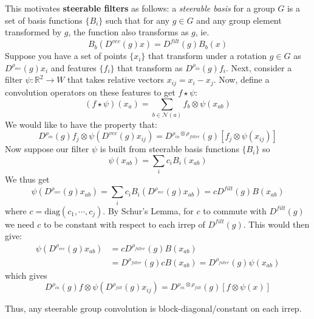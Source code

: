 \documentclass[9pt]{article}
\begin{document}
\begin{multicols}{2}
This motivates \textbf{steerable filters} as follows: 
a \textit{steerable basis} for a group $G$ is a set of 
basis functions $\{B_i\}$ such that for any $g \in G$
and any group element transformed by $g$, the function
also transforms as $g$, ie.
\begin{equation}
    B_b(D^{vec}(g)x) = D^{filt}(g)B_b(x) 
\end{equation}
\newline
Suppose you have a set of points $\{x_i\}$ that transform under a rotation $g \in G$ as $D^{\rho_{vec}}(g)x_i$ and features $\{f_i\}$ that 
transform as $D^{\rho_{in}}(g)f_i$. Next, consider a filter $\psi: \mathbb{R}^2
\to W$ that takes relative vectors $x_{ij} = x_i - x_j$. Now, define a convolution operators on these features to get 
$f \star \psi: $
\begin{equation}
    (f \star \psi)(x_a) = \sum_{ b \in \mathcal{N}(a)} f_b \otimes \psi(x_{ab})
\end{equation}
We would like to have the property that:
\begin{equation}
    D^{\rho_{in}}(g)f_j \otimes \psi(D^{vec}(g)x_{ij}) = 
    D^{\rho_{in} \otimes \rho_{filter}}(g)[f_j \otimes \psi(x_{ij})]
\end{equation}
Now suppose our filter $\psi$ is built from steerable
basis functions $\{B_i\}$ so
\begin{equation}
    \psi(x_{ab}) = \sum\limits_{i}c_iB_i(x_{ab})
\end{equation}
We thus get
\begin{equation}
    \psi(D^{\rho_{vec}}(g)x_{ab}) = \sum\limits_{i}c_iB_i(D^{\rho_{vec}}(g)x_{ab}) = cD^{filt}(g)B(x_{ab})
\end{equation}
where $c = \text{diag}(c_1,\cdots,c_{j})$. By Schur's
Lemma, for $c$ to commute with $D^{filt}(g)$ we need
$c$ to be constant with respect to each irrep of 
$D^{filt}(g)$. This would then give:
\begin{align}
    \psi(D^{\rho_{vec}}(g)x_{ab}) &= cD^{\rho_{filter}}(g)B(x_{ab}) \\
    &= D^{\rho_{filter}}(g)cB(x_{ab}) = D^{\rho_{filter}}(g)
    \psi(x_{ab})
\end{align}
which gives 
\begin{equation}
    D^{\rho_{in}}(g)f \otimes \psi(D^{\rho_{filt}}(g)x_{ij})
    = D^{\rho_{in} \otimes \rho_{filt}}(g)[f \otimes \psi(x)]
\end{equation}

Thus, any steerable group convolution is block-diagonal/constant on each
irrep. 
\end{multicols}
\end{document}
